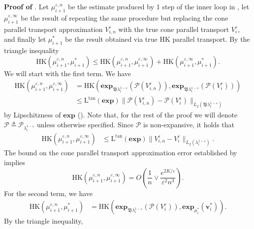\documentclass[11pt]{article}
\begin{document}
\noindent \textbf{Proof of }. Let $\mu_{i+1}^{\varepsilon, n}$ be the estimate produced by 1 step of the inner loop in ,  let $\mu_{i + 1}^{\varepsilon, \infty}$ be the result of repeating the same procedure but replacing the cone parallel transport approximation $V^{\varepsilon}_{i, n}$ with the true cone parallel transport $V_i^{\varepsilon}$, and finally let $\mu_{i+1}^*$ be the result obtained via true HK parallel transport. By the triangle inequality
\[\text{HK}(\mu_{i+1}^{\varepsilon, n}, \mu_{i + 1}^*) \leq \text{HK}(\mu_{i + 1}^{\varepsilon, n}, \mu_{i+1}^{\varepsilon, \infty}) + \text{HK}(\mu_{i+1}^{\varepsilon, \infty}, \mu_{i + 1}^*).\]
We will start with the first term. We have 
\begin{align*}
\text{HK}(\mu_{i + 1}^{\varepsilon, n}, \mu_{i + 1}^{\varepsilon, \infty}) &= \text{HK}\left(\mathbf{exp}_{\mathfrak{B}\lambda_i^{1-\varepsilon}}(\mathcal{P}(V_{i, n}^\varepsilon)),\mathbf{exp}_{\mathfrak{B}\lambda_i^{1-\varepsilon}}(\mathcal{P}(V_{i}^\varepsilon)) \right)\\ 
&\leq \text{L}^{\text{tan}}(\mathbf{exp})\|\mathcal{P}(V^\varepsilon_{i, n}) - \mathcal{P}(V^\varepsilon_i)\|_{L_2(\mathfrak{B}\lambda_{i}^{1-\varepsilon})}
\end{align*}
by Lipschitzness of $\mathbf{exp}$ (). Note that, for the rest of the proof we will denote $\mathcal{P} \triangleq \mathcal{P}_{\lambda_i^{1-\varepsilon}}$ unless otherwise specified. Since $\mathcal{P}$ is non-expansive, it holds that 
\begin{align*}
\text{HK}(\mu_{i + 1}^{\varepsilon, n}, \mu_{i + 1}^{\varepsilon, \infty}) &\leq \text{L}^{\text{tan}}(\mathbf{exp})\|V^\varepsilon_{i, n} - V^\varepsilon_i\|_{L_2(\lambda_{i}^{1-\varepsilon})}.
\end{align*}
The bound on the cone parallel transport approximation error established by  implies
\[\text{HK}(\mu_{i + 1}^{\varepsilon, n}, \mu_{i + 1}^{\varepsilon, \infty}) = O\left(\frac{1}{n} \vee\frac{e^{2K/\varepsilon}}{\varepsilon^2n^3}\right). \]
For the second term, we have
\begin{align*}
    \text{HK}(\mu_{i+1}^{\varepsilon, n}, \mu_{i + 1}^*) &= \text{HK}(\mathbf{exp}_{\mathfrak{B}\lambda_i^{1 - \varepsilon}}(\mathcal{P}(V_i^\varepsilon)), \mathbf{exp}_{\mu_i^*}(\mathbf{v}_i^{*})).
\end{align*}
By the triangle inequality,
\end{document}
